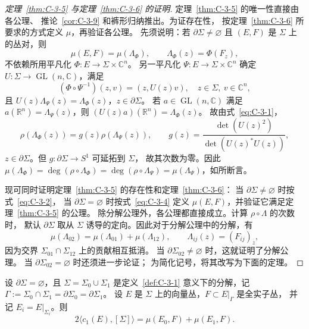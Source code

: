 \begin{proof}[定理~\ref{thm:C-3-5} 与定理~\ref{thm:C-3-6} 的证明]
定理~\ref{thm:C-3-5} 的唯一性直接由各公理、
推论~\ref{cor:C-3-9} 和裤形归纳推出。为证存在性，
按定理~\ref{thm:C-3-6} 所要求的方式定义 $\mu$，再验证各公理。
先须说明：若 $\partial\Sigma\ne\varnothing$ 且 $(E,F)$ 是 $\Sigma$ 上的丛对，则
\begin{equation}\label{eq:C-3-5}
  \mu(E,F)=\mu(\Lambda_\Phi),\qquad
  \Lambda_\Phi(z)=\Phi(F_z),
\end{equation}
不依赖所用平凡化 $\Phi:E\to\Sigma\times\mathbb C^n$。
另一平凡化 $\Psi:E\to\Sigma\times\mathbb C^n$ 确定
$U:\Sigma\to\operatorname{GL}(n,\mathbb C)$，满足
\[
  (\Phi\circ\Psi^{-1})(z,v)=(z,U(z)v),\quad z\in\Sigma,\ v\in\mathbb C^n,
\]
且 $U(z)\Lambda_\Psi(z)=\Lambda_\Phi(z)$，$z\in\partial\Sigma$。
若 $a\in\operatorname{GL}(n,\mathbb C)$ 满足
$a(\mathbb R^n)=\Lambda_\Psi(z)$，则
$(U(z)a)(\mathbb R^n)=\Lambda_\Phi(z)$。
故由式~\eqref{eq:C-3-1}，
\begin{equation}\label{eq:C-3-6}
  \rho(\Lambda_\Phi(z))=g(z)\rho(\Lambda_\Psi(z)),\qquad
  g(z)=\frac{\det(U(z)^2)}{\det(U(z)^*U(z))},
\end{equation}
$z\in\partial\Sigma$。但 $g:\partial\Sigma\to S^1$ 可延拓到 $\Sigma$，
故其次数为零。因此
$\mu(\Lambda_\Phi)=\deg(\rho\circ\Lambda_\Phi)
=\deg(\rho\circ\Lambda_\Psi)=\mu(\Lambda_\Psi)$，如所断言。

现可同时证明定理~\ref{thm:C-3-5} 的存在性和定理~\ref{thm:C-3-6}：
当 $\partial\Sigma\ne\varnothing$ 时按式~\eqref{eq:C-3-2}，
当 $\partial\Sigma=\varnothing$ 时按式~\eqref{eq:C-3-4} 定义
$\mu(E,F)$，并验证它满足定理~\ref{thm:C-3-5} 的公理。
除分解公理外，各公理都直接成立。计算 $\rho\circ\Lambda$ 的次数时，
默认 $\partial\Sigma$ 取从 $\Sigma$ 诱导的定向。因此对于分解公理中的分解，有
\[
  \mu(\Lambda_{02})=\mu(\Lambda_{01})+\mu(\Lambda_{12}),\qquad
  \Lambda_{ij}(z)=(F_{ij})_z,
\]
因为交界 $\Sigma_{01}\cap\Sigma_{12}$ 上的贡献相互抵消。
当 $\partial\Sigma_{02}\ne\varnothing$ 时，这就证明了分解公理。
当 $\partial\Sigma_{02}=\varnothing$ 时还须进一步论证；
为简化记号，将其改写为下面的定理。
\end{proof}

\begin{theorem}\label{thm:C-3-10}
设 $\partial\Sigma=\varnothing$，且 $\Sigma=\Sigma_0\cup\Sigma_1$
是定义~\ref{def:C-3-1} 意义下的分解，记
$\Gamma:=\Sigma_0\cap\Sigma_1=\partial\Sigma_0=\partial\Sigma_1$。
设 $E$ 是 $\Sigma$ 上的向量丛，$F\subset E|_\Gamma$ 是全实子丛，
并记 $E_i=E|_{\Sigma_i}$。则
\[
  2\langle c_1(E),[\Sigma]\rangle
  =\mu(E_0,F)+\mu(E_1,F).
\]
\end{theorem}

